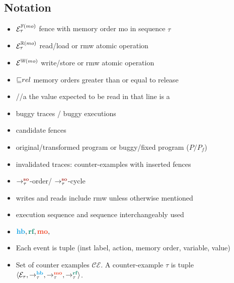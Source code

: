 \subsection{Notation}
\begin{itemize}
	\item $\ordfences{mo}_\tau$ \quad fence with memory order mo in sequence $\tau$
	\item $\ordreads{mo}_\tau$ \quad read/load or rmw atomic operation
	\item $\ordwrites{mo}$ \qquad write/store or rmw atomic operation
	\item $\mole rel$ \qquad memory orders greater than or equal to release
	\item \color{olive}//a \color{black} \qquad the value expected to be read in that line is a
	\item buggy traces / buggy executions
	\item candidate fences
	\item original/transformed program or buggy/fixed program ($ P/ P_f $)
	\item invalidated traces: counter-examples with inserted fences
	\item $\setSO$-order/ $\setSO$-cycle
	\item writes and reads include rmw unless otherwise mentioned
	\item execution sequence and sequence interchangeably used
	\item $ \lhb, \lrf, \lmo, $ 
	\item Each event is tuple (inst label, action, memory order, variable, value) 
	\item Set of counter examples $ \mathcal{CE} $. A counter-example $ \tau $ is tuple $ \langle \events_\tau, \setHB, \setMO, \setRF \rangle $. 
\end{itemize}